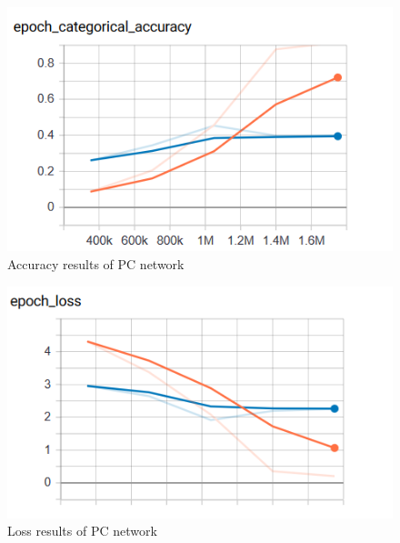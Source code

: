 \begin{figure}[!ht]
    \centering
    \includegraphics[scale=0.60]{images/PC_early_accuracy.png}
    \caption{Accuracy results of PC network}
    \label{fig:early_PC_acc}
\end{figure}
\begin{figure}[!ht]
    \centering
    \includegraphics[scale=0.60]{images/PC_early_loss.png}
    \caption{Loss results of PC network}
    \label{fig:early_PC_loss}
\end{figure}

